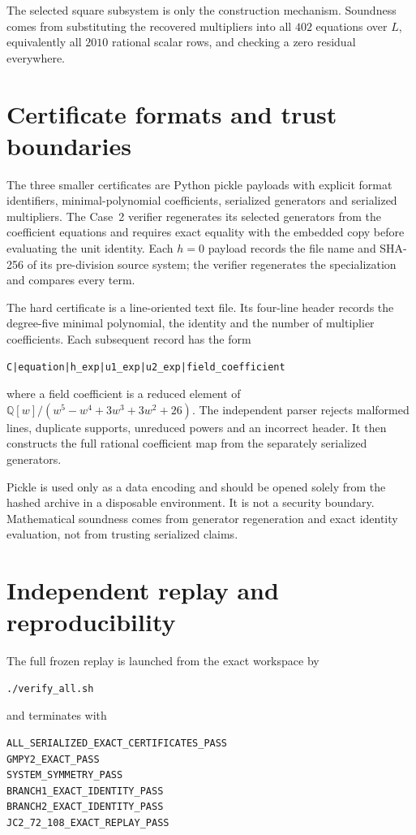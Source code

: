 \documentclass[11pt,a4paper]{article}
\theoremstyle{remark}
\newcommand{\Q}{\mathbb{Q}}
\begin{document}
The selected square subsystem is only the construction mechanism. Soundness comes from substituting the recovered multipliers into all $402$ equations over $L$, equivalently all $2010$ rational scalar rows, and checking a zero residual everywhere.

\section{Certificate formats and trust boundaries}

The three smaller certificates are Python pickle payloads with explicit format identifiers, minimal-polynomial coefficients, serialized generators and serialized multipliers. The Case~2 verifier regenerates its selected generators from the coefficient equations and requires exact equality with the embedded copy before evaluating the unit identity. Each $h=0$ payload records the file name and SHA-256 of its pre-division source system; the verifier regenerates the specialization and compares every term.

The hard certificate is a line-oriented text file. Its four-line header records the degree-five minimal polynomial, the identity and the number of multiplier coefficients. Each subsequent record has the form
\begin{verbatim}
C|equation|h_exp|u1_exp|u2_exp|field_coefficient
\end{verbatim}
where a field coefficient is a reduced element of $\Q[w]/(w^5-w^4+3w^3+3w^2+26)$. The independent parser rejects malformed lines, duplicate supports, unreduced powers and an incorrect header. It then constructs the full rational coefficient map from the separately serialized generators.

Pickle is used only as a data encoding and should be opened solely from the hashed archive in a disposable environment. It is not a security boundary. Mathematical soundness comes from generator regeneration and exact identity evaluation, not from trusting serialized claims.

\section{Independent replay and reproducibility}

The full frozen replay is launched from the exact workspace by
\begin{verbatim}
./verify_all.sh
\end{verbatim}
and terminates with
\begin{verbatim}
ALL_SERIALIZED_EXACT_CERTIFICATES_PASS
GMPY2_EXACT_PASS
SYSTEM_SYMMETRY_PASS
BRANCH1_EXACT_IDENTITY_PASS
BRANCH2_EXACT_IDENTITY_PASS
JC2_72_108_EXACT_REPLAY_PASS
\end{verbatim}
\end{document}
